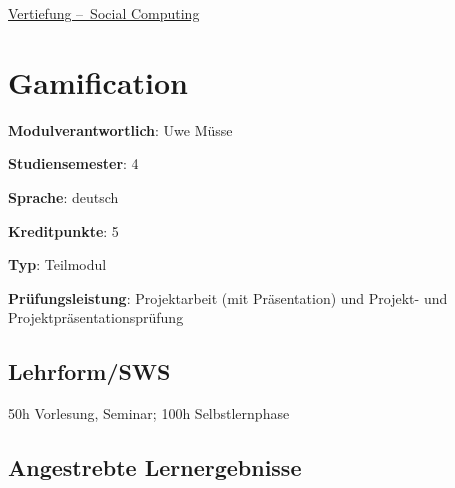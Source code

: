\hyperref[/mi-2017/modulbeschreibungen-bachelor/BA_Vertiefung_SocialComputing]{Vertiefung – Social Computing}

\hypertarget{gamificationpathlabelmi-2017modulbeschreibungen-bachelorba_sc_gamification}{%
\chapter{Gamification\label{/mi-2017/modulbeschreibungen-bachelor/BA_SC_gamification}}\label{gamificationpathlabelmi-2017modulbeschreibungen-bachelorba_sc_gamification}}

\begin{modulHead}
\textbf{Modulverantwortlich}: Uwe
Müsse
\end{modulHead}
\begin{modulHead}
\textbf{Studiensemester}:
4
\end{modulHead}
\begin{modulHead}
\textbf{Sprache}:
deutsch
\end{modulHead}
\begin{modulHead}
\textbf{Kreditpunkte}:
5
\end{modulHead}
\begin{modulHead}
\textbf{Typ}:
Teilmodul
\end{modulHead}
\begin{modulHead}
\textbf{Prüfungsleistung}:
Projektarbeit (mit Präsentation) und Projekt- und
Projektpräsentationsprüfung
\end{modulHead}


\hypertarget{lehrformswspathlabelmi-2017modulbeschreibungen-bachelorba_sc_gamification}{%
\section*{Lehrform/SWS\label{/mi-2017/modulbeschreibungen-bachelor/BA_SC_gamification}}\label{lehrformswspathlabelmi-2017modulbeschreibungen-bachelorba_sc_gamification}}

50h Vorlesung, Seminar; 100h Selbstlernphase

\hypertarget{angestrebte-lernergebnissepathlabelmi-2017modulbeschreibungen-bachelorba_sc_gamification}{%
\section*{Angestrebte
Lernergebnisse\label{/mi-2017/modulbeschreibungen-bachelor/BA_SC_gamification}}\label{angestrebte-lernergebnissepathlabelmi-2017modulbeschreibungen-bachelorba_sc_gamification}}

